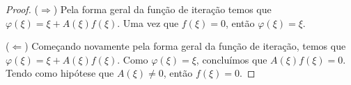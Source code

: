 \begin{proof}
($\Rightarrow$) Pela forma geral da função de iteração temos que $\varphi(\xi) = \xi + A(\xi)f(\xi)$. Uma vez que $f(\xi) = 0$, então $\varphi(\xi) = \xi$.

($\Leftarrow$) Começando novamente pela forma geral da função de iteração, temos que $\varphi(\xi) = \xi + A(\xi)f(\xi)$. Como $\varphi(\xi) = \xi$, concluímos que $A(\xi) f(\xi) = 0$. Tendo como hipótese que $A(\xi) \neq 0$, então $f(\xi) = 0$.
\end{proof}




